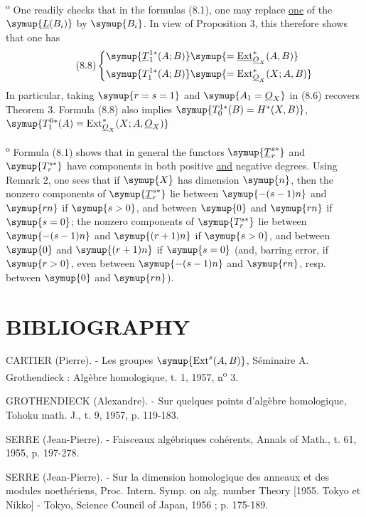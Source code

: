 \medskip
{}\textsuperscript{o} One readily checks that in the formulas (8.1), one may replace \uline{one} of the
$\symup{\underline{L}(B_i)}$ by $\symup{B_i}$. In view of Proposition 3, this therefore shows that one has
\begin{equation}\tag{8.8}
\left\{
\begin{aligned}\symup{\underline{T}_{1}^{1*}(A;B)}&\symup{=\Extsh_{\Osh_X}^{*}(A,B)}\\\symup{T_{1}^{1*}(A;B)}&\symup{=\operatorname{Ext}_{\Osh_X}^{*}(X;A,B)}\end{aligned}
\right.
\end{equation}
In particular, taking $\symup{r=s=1}$ and $\symup{A_1=\Osh_X}$ in (8.6) recovers Theorem 3.
Formula (8.8) also implies
$\symup{T_{0}^{1*}(B)=H^{*}(X,B)}$, $\symup{T_{1}^{0*}(A)=\operatorname{Ext}_{\Osh_X}^{*}(X;A,\Osh_X)}$

\medskip
{}\textsuperscript{o} Formula (8.1) shows that in general the functors
$\symup{\underline{T}_{r}^{s*}}$ and $\symup{T_{r}^{s*}}$ have components in both positive \uline{and}
negative degrees. Using Remark 2, one sees that if $\symup{X}$ has dimension $\symup{n}$, then
the nonzero components of $\symup{\underline{T}_{r}^{s*}}$ lie between $\symup{-(s-1)n}$ and
$\symup{rn}$ if $\symup{s>0}$, and between $\symup{0}$ and $\symup{rn}$ if $\symup{s=0}$; the nonzero components of
$\symup{T_{r}^{s*}}$ lie between $\symup{-(s-1)n}$ and $\symup{(r+1)n}$ if $\symup{s>0}$, and between $\symup{0}$ and
$\symup{(r+1)n}$ if $\symup{s=0}$ (and, barring error, if $\symup{r>0}$, even between
$\symup{-(s-1)n}$ and $\symup{rn}$, resp. between $\symup{0}$ and $\symup{rn}$).

\section*{\centering\normalfont BIBLIOGRAPHY}

\noindent[1] CARTIER (Pierre). - Les groupes
$\symup{\operatorname{Ext}^{s}(A,B)}$, Séminaire A. Grothendieck : Algèbre homologique,
t. 1, 1957, n\textsuperscript{o} 3.

\noindent[2] GROTHENDIECK (Alexandre). - Sur quelques points d'algèbre
homologique, Tohoku math. J., t. 9, 1957, p. 119-183.

\noindent[3] SERRE (Jean-Pierre). - Faisceaux algébriques cohérents,
Annals of Math., t. 61, 1955, p. 197-278.

\noindent[4] SERRE (Jean-Pierre). - Sur la dimension homologique des anneaux
et des modules noethériens, Proc. Intern. Symp. on alg. number Theory
[1955. Tokyo et Nikko] - Tokyo, Science Council of Japan, 1956 ;
p. 175-189.

